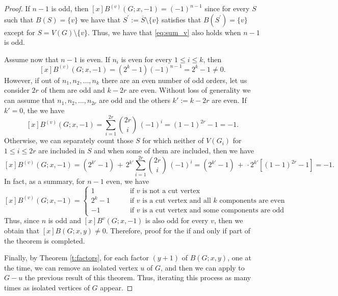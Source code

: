 \documentclass[review]{elsarticle}
\begin{document}
\begin{proof}
    If $n-1$ is odd, then $[x]B^{(v)}(G;x,-1)=(-1)^{n-1}$ since for every $S$ such that $B(S)=\{v\}$ we have that $S^\prime:=\overline{S}\setminus\{v\}$ satisfies that $B(S^\prime)=\{v\}$ except for $S=V(G)\setminus\{v\}$. Thus, we have that \eqref{eq:sum_v} also holds when $n-1$ is odd.
    
    Assume now that $n-1$ is even.  If $n_i$ is even for every $1\le i\le k$, then 
    $$[x]B^{(v)}(G;x,-1)=(2^k-1)(-1)^{n-1}=2^k-1\neq0.$$
    However, if out of $n_1,n_2,\ldots,n_k$ there are an even number of odd orders, let us consider $2r$ of them are odd and $k-2r$ are even. Without loss of generality we can assume that $n_1,n_2,\ldots,n_{2r}$ are odd and the others $k':=k-2r$ are even. If $k'=0$, the we have
    \[
      [x]B^{(v)}(G;x,-1)=\displaystyle\sum_{i=1}^{2r} \binom{2r}{i}\,(-1)^{i}=(1-1)^{2r}-1=-1.
    \]
    Otherwise, we can separately count those $S$ for which neither of $V(G_i)$ for $1\le i\le 2r$ are included in $S$ and when some of them are included, then we have
    \[
     [x]B^{(v)}(G;x,-1)= (2^{k'}-1) \,+\,2^{k'}\displaystyle\sum_{i=1}^{2r} \binom{2r}{i}\,(-1)^{i}=(2^{k'}-1) \,+ \,\cdot2^{k'}[(1-1)^{2r}-1]=-1.
    \]
    In fact, as a summary, for $n-1$ even, we have 
    \[
     [x]B^{(v)}(G;x,-1)=\left\{\begin{aligned}
         1 \qquad & \text{if } v \text{ is not a cut vertex}\\
         2^{k}-1 \qquad & \text{if } v \text{ is a cut vertex and all } k \text{ components are even} \\
         -1 \qquad & \text{if } v \text{ is a cut vertex and some components are odd}
     \end{aligned}\right.
    \]
    Thus, since $n$ is odd and $[x]B^v(G;x,-1)$ is also odd for every $v$, then we obtain that $[x]B(G;x,y)\neq0$.
    Therefore, proof for the if and only if part of the theorem is completed.

    Finally, by Theorem \ref{t:factors}, for each factor $(y+1)$ of $B(G;x,y)$, one at the time, we can remove an isolated vertex $u$ of $G$, and then we can apply to $G-{u}$ the previous result of this theorem. Thus, iterating this process as many times as isolated vertices of $G$ appear.
\end{proof}








\end{document}
